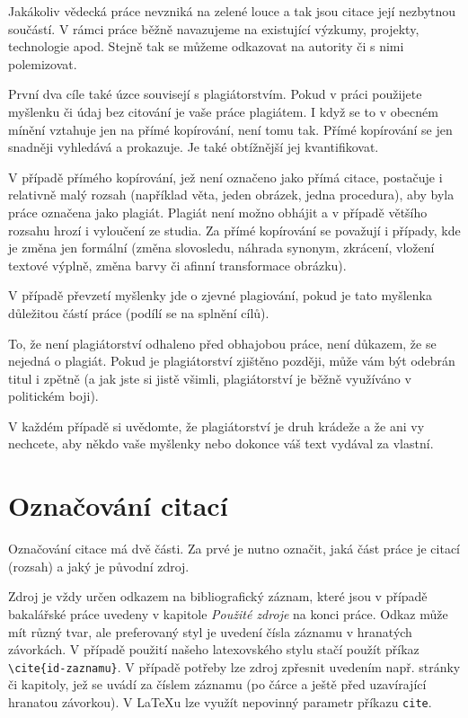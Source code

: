 \documentclass[male,czech,api_bc]{kitheses}
\begin{document}
Jakákoliv vědecká práce nevzniká na zelené louce a tak jsou citace její nezbytnou součástí. V rámci práce běžně navazujeme na existující výzkumy, projekty, technologie apod. Stejně tak se můžeme odkazovat na autority či s nimi polemizovat.

První dva cíle také úzce souvisejí s plagiátorstvím. Pokud v práci použijete myšlenku či údaj bez citování je vaše práce plagiátem. I když se to v obecném mínění vztahuje jen na přímé kopírování, není tomu tak. Přímé kopírování se jen snadněji vyhledává a prokazuje. Je také obtížnější jej kvantifikovat.

V případě přímého kopírování, jež není označeno jako přímá citace, postačuje i relativně malý rozsah (například věta, jeden obrázek, jedna procedura), aby byla práce označena jako plagiát. Plagiát není možno obhájit a v případě většího rozsahu hrozí i vyloučení ze studia. Za přímé kopírování se považují i případy, kde je změna jen formální (změna slovosledu, náhrada synonym, zkrácení, vložení textové výplně, změna barvy či afinní transformace obrázku).

V případě převzetí myšlenky jde o zjevné plagiování, pokud je tato myšlenka důležitou částí práce (podílí se na splnění cílů). 

To, že není plagiátorství odhaleno před obhajobou práce, není důkazem, že se nejedná o plagiát. Pokud je plagiátorství zjištěno později, může vám být odebrán titul i zpětně (a jak jste si jistě všimli, plagiátorství je běžně využíváno v politickém boji).

V každém případě si uvědomte, že plagiátorství je druh krádeže a že ani vy nechcete, aby někdo vaše myšlenky nebo dokonce váš text vydával za vlastní.

\section{Označování citací}

Označování citace má dvě části. Za prvé je nutno označit, jaká část práce je citací (rozsah) a jaký je původní zdroj. 

Zdroj je vždy určen odkazem na bibliografický záznam, které jsou v případě bakalářské práce uvedeny v kapitole \textit{Použité zdroje} na konci práce. Odkaz může mít různý tvar, ale preferovaný styl je uvedení čísla záznamu v hranatých závorkách. V případě použití našeho latexovského stylu stačí použít příkaz \verb!\cite{id-zaznamu}!. V případě potřeby lze zdroj zpřesnit uvedením např. stránky či kapitoly, jež se uvádí za číslem záznamu (po čárce a ještě před uzavírající hranatou závorkou). V \LaTeX u lze využít nepovinný parametr příkazu \verb!cite!.
\end{document}
